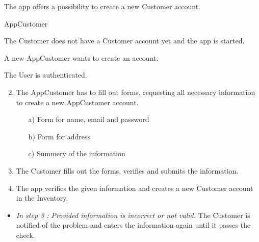 \begin{description}[font=\normalfont\itshape]

\item[Brief Description] The app offers a possibility to create a new Customer account.

\item[Involved Actors] AppCustomer

\item[Precondition] The Customer does not have a Customer account yet and the app is started.

\item[Trigger] A new AppCustomer wants to create an account.

\item[Postcondition] The User is authenticated.

\item[Standard Process]

\begin{enumerate}[leftmargin=.5cm]
\item[]
\item The AppCustomer has to fill out forms, requesting all necessary information to create a new AppCustomer account.
\begin{itemize}
	\item[a)] Form for name, email and password
	\item[b)] Form for address
	\item[c)] Summery of the information 
\end{itemize}
\item The Customer fills out the forms, verifies and submits the information.
\item The app verifies the given information and creates a new Customer account in the Inventory.
\end{enumerate}

\item[Alternative or Exceptional Processes]
\begin{itemize}[leftmargin=.3cm]
\item[]
\item \textit{In step 3 : Provided information is incorrect or not valid.} \newline
The Customer is notified of the problem and enters the information again until it passes the check.
\end{itemize}

\end{description}

